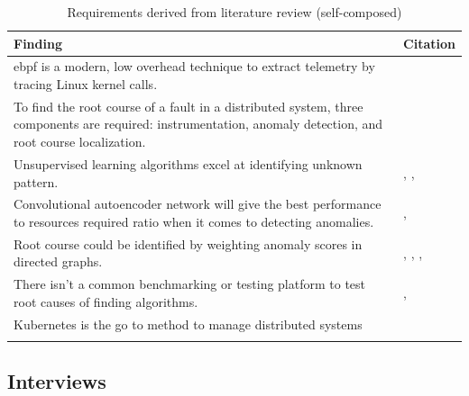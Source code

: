 \begin{longtable}{|p{105mm}|p{50mm}|}
    \hline
    \textbf{Finding} &
    \textbf{Citation} \\ \hline
    
    \ac{ebpf} is a modern, low overhead technique to extract telemetry by tracing Linux kernel calls. &
    \cite{LKMLIngo52:online} \\ \hline
    
    To find the root course of a fault in a distributed system, three components are required: instrumentation, anomaly detection, and root course localization. &
    \cite{wu2020microrca} \\ \hline
    
    Unsupervised learning algorithms excel at identifying unknown pattern. &
    \cite{silver2017mastering}, \cite{kumarage2018anomaly}, \cite{khoshnevisan2019rsm} \\ \hline
    Convolutional autoencoder network will give the best performance to resources required ratio when it comes to detecting anomalies. &
    \cite{zhang2019deep}, \cite{khoshnevisan2019rsm} \\ \hline
    
    Root course could be identified by weighting anomaly scores in directed graphs. &
    \cite{samir2019dla}, \cite{wu2020microrca}, \cite{ma2020automap}, \cite{meng2020localizing} \\ \hline
    There isn’t a common benchmarking or testing platform to test root causes of finding algorithms. &
    \cite{wu2020microrca}, \cite{soldani2021anomaly} \\ \hline
    
    Kubernetes is the go to method to manage distributed systems &
    \cite{CloudNat36:online} \\ \hline

    \caption{Requirements derived from literature review (self-composed)}
    
\end{longtable}

\subsection{Interviews}

